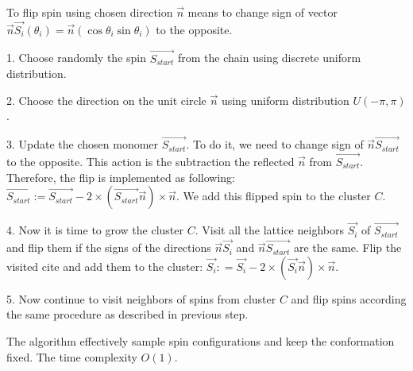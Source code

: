  To flip spin  using chosen direction $\vec{n}$ means to change sign of vector $ \vec{n} \vec{S_i} (\theta_i) = \vec{n}(\cos \theta_i \sin \theta_i  )$  to the opposite. 

1. Choose randomly the spin $\overrightarrow{S_{start}}$ from the chain using discrete uniform distribution. 

2. Choose the direction on the unit circle $\vec{n}$ using uniform distribution $ U(-\pi, \pi)$.

3. Update the chosen monomer $\overrightarrow{S_{start}}$. To do it, we need to change sign of $ \vec{n}  \overrightarrow{S_{start}} $ to the opposite. This action is the subtraction the reflected  $\vec{n}$  from $ \overrightarrow{S_{start}} $. Therefore, the flip is implemented as following: $\overrightarrow{S_{start}} := \overrightarrow{S_{start}} - 2 \times ( \overrightarrow{S_{start}} \vec{n}) \times \vec{n}$. We add this flipped spin to the cluster $C$.

4. Now it is time to grow the cluster $C$. Visit all the lattice neighbors $\overrightarrow{S_{i}}$ of $\overrightarrow{S_{start}}$ and flip them if the signs of the directions $ \vec{n} \overrightarrow{S_{i}}$  and $ \vec{n} \overrightarrow{S_{start}}$ are the same. Flip the visited cite and add them to the cluster: $\overrightarrow{S_{i}} : = \overrightarrow{S_{i}} - 2 \times ( \overrightarrow{S_{i}} \vec{n}) \times \vec{n}$. 

5. Now continue to visit neighbors of spins from cluster $C$ and flip spins according the same procedure as described in previous step. 

The algorithm effectively sample spin configurations and keep the conformation fixed. The time complexity $O(1)$. 
 



